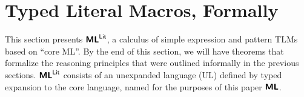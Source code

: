 \documentclass[acmsmall,screen]{acmart}
\begin{document}
\begin{comment}
\end{comment}

\section{Typed Literal Macros, Formally}
\label{sec:setlms-formally}

This section presents  $\textsf{\textbf{ML}}^\textsf{Lit}$, a calculus of simple expression and pattern TLMs based on ``core ML''. By the end of this section, we will have theorems that formalize the reasoning principles that were outlined informally in the previous sections. $\textsf{\textbf{ML}}^\textsf{Lit}$ consists of an {unexpanded language} ({UL}) defined by typed expansion to the core language, named for the purposes of this paper $\textsf{\textbf{ML}}$. 
\end{document}
